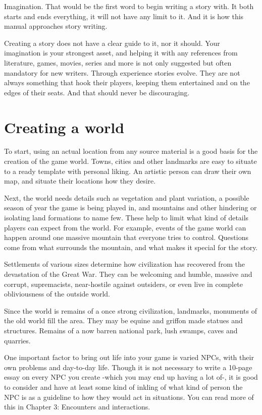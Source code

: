 \documentclass[11pt,a4paper,twocolumn]{book}
\begin{document}
    Imagination. That would be the first word to begin writing a story with. It both starts and ends everything, it will not have any limit to it. And it is how this manual approaches story writing. 
    
    Creating a story does not have a clear guide to it, nor it should. Your imagination is your strongest asset, and helping it with any references from literature, games, movies, series and more is not only suggested but often mandatory for new writers. Through experience stories evolve. They are not always something that hook their players, keeping them entertained and on the edges of their seats. And that should never be discouraging.
    
    \section*{Creating a world}
    
    To start, using an actual location from any source material is a good basis for the creation of the game world. Towns, cities and other landmarks are easy to situate to a ready template with personal liking. An artistic person can draw their own map, and situate their locations how they desire.
    
    Next, the world needs details such as vegetation and plant variation, a possible season of year the game is being played in, and mountains and other hindering or isolating land formations to name few. These help to limit what kind of details players can expect from the world. For example, events of the game world can happen around one massive mountain that everyone tries to control. Questions come from what surrounds the mountain, and what makes it special for the story.
    
    Settlements of various sizes determine how civilization has recovered from the devastation of the Great War. They can be welcoming and humble, massive and corrupt, supremacists, near-hostile against outsiders, or even live in complete obliviousness of the outside world.
    
    Since the world is remains of a once strong civilization, landmarks, monuments of the old world fill the area. They may be equine and griffon made statues and structures. Remains of a now barren national park, lush swamps, caves and quarries.
    
    One important factor to bring out life into your game is varied NPCs, with their own problems and day-to-day life. Though it is not necessary to write a 10-page essay on every NPC you create -which you may end up having a lot of-, it is good to consider and have at least some kind of inkling of what kind of person the NPC is as a guideline to how they would act in situations. You can read more of this in Chapter 3: Encounters and interactions.
    
\end{document}

